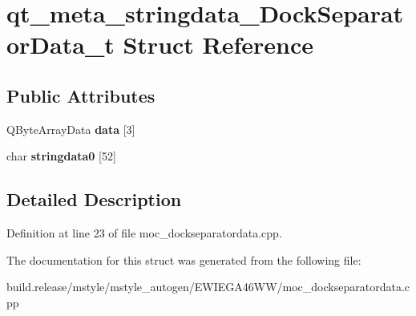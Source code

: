 \hypertarget{structqt__meta__stringdata___dock_separator_data__t}{}\section{qt\+\_\+meta\+\_\+stringdata\+\_\+\+Dock\+Separator\+Data\+\_\+t Struct Reference}
\label{structqt__meta__stringdata___dock_separator_data__t}
\subsection*{Public Attributes}
\begin{DoxyCompactItemize}
\item 
\mbox{\label{structqt__meta__stringdata___dock_separator_data__t_add28a7e5dbd931674d8f00fc1c89176d}} 
Q\+Byte\+Array\+Data {\bfseries data} \mbox{[}3\mbox{]}
\item 
\mbox{\label{structqt__meta__stringdata___dock_separator_data__t_ab587b6e81d0486ae98140f5a801b1214}} 
char {\bfseries stringdata0} \mbox{[}52\mbox{]}
\end{DoxyCompactItemize}


\subsection{Detailed Description}


Definition at line 23 of file moc\+\_\+dockseparatordata.\+cpp.



The documentation for this struct was generated from the following file\+:\begin{DoxyCompactItemize}
\item 
build.\+release/mstyle/mstyle\+\_\+autogen/\+E\+W\+I\+E\+G\+A46\+W\+W/moc\+\_\+dockseparatordata.\+cpp\end{DoxyCompactItemize}
